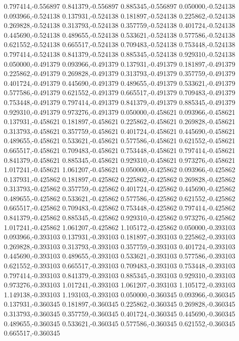 0.797414,-0.556897
0.841379,-0.556897
0.885345,-0.556897
0.050000,-0.524138
0.093966,-0.524138
0.137931,-0.524138
0.181897,-0.524138
0.225862,-0.524138
0.269828,-0.524138
0.313793,-0.524138
0.357759,-0.524138
0.401724,-0.524138
0.445690,-0.524138
0.489655,-0.524138
0.533621,-0.524138
0.577586,-0.524138
0.621552,-0.524138
0.665517,-0.524138
0.709483,-0.524138
0.753448,-0.524138
0.797414,-0.524138
0.841379,-0.524138
0.885345,-0.524138
0.929310,-0.524138
0.050000,-0.491379
0.093966,-0.491379
0.137931,-0.491379
0.181897,-0.491379
0.225862,-0.491379
0.269828,-0.491379
0.313793,-0.491379
0.357759,-0.491379
0.401724,-0.491379
0.445690,-0.491379
0.489655,-0.491379
0.533621,-0.491379
0.577586,-0.491379
0.621552,-0.491379
0.665517,-0.491379
0.709483,-0.491379
0.753448,-0.491379
0.797414,-0.491379
0.841379,-0.491379
0.885345,-0.491379
0.929310,-0.491379
0.973276,-0.491379
0.050000,-0.458621
0.093966,-0.458621
0.137931,-0.458621
0.181897,-0.458621
0.225862,-0.458621
0.269828,-0.458621
0.313793,-0.458621
0.357759,-0.458621
0.401724,-0.458621
0.445690,-0.458621
0.489655,-0.458621
0.533621,-0.458621
0.577586,-0.458621
0.621552,-0.458621
0.665517,-0.458621
0.709483,-0.458621
0.753448,-0.458621
0.797414,-0.458621
0.841379,-0.458621
0.885345,-0.458621
0.929310,-0.458621
0.973276,-0.458621
1.017241,-0.458621
1.061207,-0.458621
0.050000,-0.425862
0.093966,-0.425862
0.137931,-0.425862
0.181897,-0.425862
0.225862,-0.425862
0.269828,-0.425862
0.313793,-0.425862
0.357759,-0.425862
0.401724,-0.425862
0.445690,-0.425862
0.489655,-0.425862
0.533621,-0.425862
0.577586,-0.425862
0.621552,-0.425862
0.665517,-0.425862
0.709483,-0.425862
0.753448,-0.425862
0.797414,-0.425862
0.841379,-0.425862
0.885345,-0.425862
0.929310,-0.425862
0.973276,-0.425862
1.017241,-0.425862
1.061207,-0.425862
1.105172,-0.425862
0.050000,-0.393103
0.093966,-0.393103
0.137931,-0.393103
0.181897,-0.393103
0.225862,-0.393103
0.269828,-0.393103
0.313793,-0.393103
0.357759,-0.393103
0.401724,-0.393103
0.445690,-0.393103
0.489655,-0.393103
0.533621,-0.393103
0.577586,-0.393103
0.621552,-0.393103
0.665517,-0.393103
0.709483,-0.393103
0.753448,-0.393103
0.797414,-0.393103
0.841379,-0.393103
0.885345,-0.393103
0.929310,-0.393103
0.973276,-0.393103
1.017241,-0.393103
1.061207,-0.393103
1.105172,-0.393103
1.149138,-0.393103
1.193103,-0.393103
0.050000,-0.360345
0.093966,-0.360345
0.137931,-0.360345
0.181897,-0.360345
0.225862,-0.360345
0.269828,-0.360345
0.313793,-0.360345
0.357759,-0.360345
0.401724,-0.360345
0.445690,-0.360345
0.489655,-0.360345
0.533621,-0.360345
0.577586,-0.360345
0.621552,-0.360345
0.665517,-0.360345
